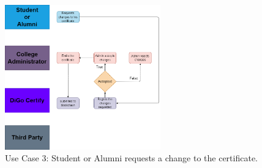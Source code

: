 \begin{figure}[H]
    \centering
    \includegraphics[width=0.6\textwidth, height=0.6\textheight, keepaspectratio]{final-report/assets/certificate-update.drawio.png}
    \caption{Use Case 3: Student or Alumni requests a change to the certificate.}
    \label{fig:use-case-3}
\end{figure}

